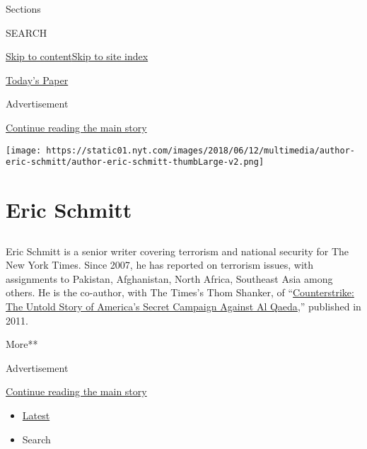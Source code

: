 Sections

SEARCH

\protect\hyperlink{site-content}{Skip to
content}\protect\hyperlink{site-index}{Skip to site index}

\href{https://myaccount.nytimes.com/auth/login?response_type=cookie\&client_id=vi}{}

\href{https://www.nytimes.com/section/todayspaper}{Today's Paper}

Advertisement

\protect\hyperlink{after-top}{Continue reading the main story}

\texttt{[image: https://static01.nyt.com/images/2018/06/12/multimedia/author-eric-schmitt/author-eric-schmitt-thumbLarge-v2.png]}

\hypertarget{eric-schmitt}{%
\section{Eric Schmitt}\label{eric-schmitt}}

\subsection{}

Eric Schmitt is a senior writer covering terrorism and national security
for The New York Times. Since 2007, he has reported on terrorism issues,
with assignments to Pakistan, Afghanistan, North Africa, Southeast Asia
among others. He is the co-author, with The Times's Thom Shanker, of
``\href{http://www.counterstrikethebook.com/index.html}{Counterstrike:
The Untold Story of America's Secret Campaign Against Al Qaeda},''
published in 2011.

More**

Advertisement

\protect\hyperlink{after-mid1}{Continue reading the main story}

\begin{itemize}
\tightlist
\item
  \protect\hyperlink{stream-panel}{Latest}
\item
  Search
\end{itemize}

